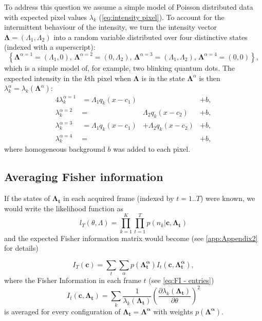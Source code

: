 To address this question we assume a simple model of Poisson distributed data with expected pixel values $\lambda_k$ (\autoref{eq:intensity pixel}). To account for the intermittent behaviour of the intensity, we turn the intensity vector $\bm{\Lambda}=(\Lambda_1,\Lambda_2)$ into a random variable distributed over four distinctive states (indexed with a superscript):
%
\begin{equation}
	\left\{ \bm{\Lambda}^{\alpha=1}=(\Lambda_1,0),\,\bm{\Lambda}^{\alpha=2}=(0,\Lambda_2),\,\bm{\Lambda}^{\alpha=3}=(\Lambda_1,\Lambda_2),\,\bm{\Lambda}^{\alpha=4}=(0,0)\right\},
	\label{eq:intensity states}
\end{equation}
%
which is a simple model of, for example, two blinking quantum dots. The expected intensity in the $k$th pixel when $\bm{\Lambda}$ is in the state $\bm{\Lambda}^\alpha$ is then $\lambda_k^\alpha=\lambda_k(\bm{\Lambda}^\alpha)$:
%
\begin{alignat}{4}
	\lambda_k^{\alpha=1}&=\Lambda_1q_k(x-c_1) & &+b,\nonumber\\ 
	\lambda_k^{\alpha=2}&=&\Lambda_2q_k(x-c_2) &+b,\nonumber\\ 
	\lambda_k^{\alpha=3}&=\Lambda_1q_k(x-c_1)&+\Lambda_2q_k(x-c_2)&+b,\nonumber\\ 
	\lambda_k^{\alpha=4}&=& &+b,
	\label{eq:lambda states}
\end{alignat}
%
where homogeneous background $b$ was added to each pixel.

\subsection{Averaging Fisher information\label{sub:avg FI}}
If the states of $\bm{\Lambda_t}$ in each acquired frame (indexed by $t=1..T$) were known, we would write the likelihood function as 
%
\begin{equation}
	l_T(\theta,\Lambda)=\prod_{k=1}^K\prod_{t=1}^Tp(n_k|\bm{c},\bm{\Lambda_t})
\end{equation}
%
and the expected Fisher information matrix would become (see \autoref{app:Appendix2} for details)

\begin{equation}
	I_T(\bm{c})=\sum_t\sum_\alpha p(\bm{\Lambda^\alpha_t})I_t(\bm{c},\bm{\Lambda^\alpha_t}),
\end{equation}
%
where the Fisher Information in each frame $t$ (see \autoref{eq:FI - entries}) 
%
\begin{equation}
	I_t(\bm{c},\bm{\Lambda_t})=
	\sum_k\frac{1}{\lambda_k(\bm{\Lambda_t})}\left(\frac{\partial\lambda_k(\bm{\Lambda_t})}{\partial \theta}\right)^2
\end{equation}
%
is averaged for every configuration of $\bm{\Lambda_t=\Lambda^\alpha}$ with weights $p(\bm{\Lambda^\alpha})$. 

